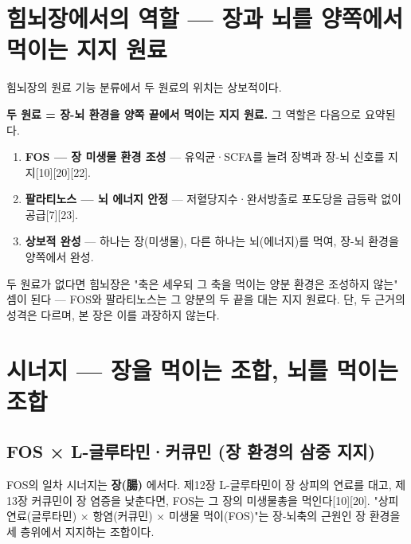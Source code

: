 \documentclass[11pt,oneside]{book}
\begin{document}
\section{힘뇌장에서의 역할 — 장과 뇌를 양쪽에서 먹이는 지지 원료}
힘뇌장의 원료 기능 분류에서 두 원료의 위치는 상보적이다.

\vspace{2pt}\vspace{3pt}

\textbf{두 원료 = 장-뇌 환경을 양쪽 끝에서 먹이는 지지 원료.} 그 역할은 다음으로 요약된다.

\begin{enumerate}[leftmargin=6mm,itemsep=1pt,topsep=2pt]
  \item \textbf{FOS — 장 미생물 환경 조성} — 유익균·SCFA를 늘려 장벽과 장-뇌 신호를 지지[10][20][22].
  \item \textbf{팔라티노스 — 뇌 에너지 안정} — 저혈당지수·완서방출로 포도당을 급등락 없이 공급[7][23].
  \item \textbf{상보적 완성} — 하나는 장(미생물), 다른 하나는 뇌(에너지)를 먹여, 장-뇌 환경을 양쪽에서 완성.
\end{enumerate}
두 원료가 없다면 힘뇌장은 "축은 세우되 그 축을 먹이는 양분 환경은 조성하지 않는" 셈이 된다 — FOS와 팔라티노스는 그 양분의 두 끝을 대는 지지 원료다. 단, 두 근거의 성격은 다르며, 본 장은 이를 과장하지 않는다.

\section{시너지 — 장을 먹이는 조합, 뇌를 먹이는 조합}
\subsection{FOS × L-글루타민·커큐민 (장 환경의 삼중 지지)}
FOS의 일차 시너지는 \textbf{장(腸)} 에서다. 제12장 L-글루타민이 장 상피의 연료를 대고, 제13장 커큐민이 장 염증을 낮춘다면, FOS는 그 장의 미생물총을 먹인다[10][20]. "상피 연료(글루타민) × 항염(커큐민) × 미생물 먹이(FOS)"는 장-뇌축의 근원인 장 환경을 세 층위에서 지지하는 조합이다.
\end{document}

